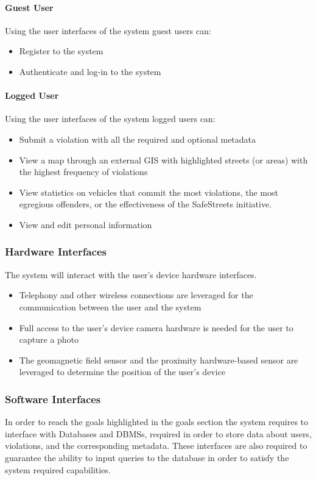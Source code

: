 \paragraph{Guest User}
	Using the user interfaces of the system guest users can:
	\begin{itemize}
		\item Register to the system
		\item Authenticate and log-in to the system
	\end{itemize}
	
\paragraph{Logged User}
	Using the user interfaces of the system logged users can:
	\begin{itemize}
		\item Submit a violation with all the required and optional metadata
		\item View a map through an external GIS with highlighted streets (or areas) with the highest frequency of violations
		\item View statistics on vehicles that commit the most violations, the most egregious offenders, or the effectiveness of the SafeStreets initiative.
		\item View and edit personal information
	\end{itemize}
		
\subsubsection{Hardware Interfaces}
	The system will interact with the user's device hardware interfaces.	
	\begin{itemize} 
		\item Telephony and other wireless connections are leveraged for the communication between the user and the system
		\item Full access to the user's device camera hardware is needed for the user to capture a photo
		\item The geomagnetic field sensor and the proximity hardware-based sensor are leveraged to determine the position of the user's device
	\end{itemize}

\subsubsection{Software Interfaces}
	In order to reach the goals highlighted in the goals section the system requires to interface with Databases and DBMSs, required in order to store data about users, violations, and the corresponding metadata. These interfaces are also required to guarantee the ability to input queries to the database in order to satisfy the system required capabilities.
	
